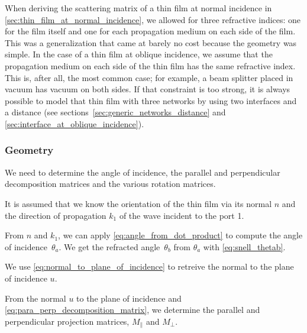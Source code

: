 When deriving the scattering matrix of a thin film at normal incidence in \cref{sec:thin_film_at_normal_incidence}, we allowed for three refractive indices: one for the film itself and one for each propagation medium on each side of the film.
This was a generalization that came at barely no cost because the geometry was simple.
In the case of a thin film at oblique incidence, we assume that the propagation medium on each side of the thin film has the same refractive index.
This is, after all, the most common case;
for example, a beam splitter placed in vacuum has vacuum on both sides.
If that constraint is too strong, it is always possible to model that thin film with three networks by using two interfaces and a distance (see sections~\ref{sec:generic_networks_distance} and \ref{sec:interface_at_oblique_incidence}).

\subsubsection{Geometry}
\label{sec:thin_film_geometry}
We need to determine the angle of incidence, the parallel and perpendicular decomposition matrices and the various rotation matrices.

It is assumed that we know the orientation of the thin film via its normal $n$ and the direction of propagation $k_1$ of the wave incident to the port 1.

From $n$ and $k_1$, we can apply \cref{eq:angle_from_dot_product} to compute the angle of incidence~$\theta_a$.
We get the refracted angle~$\theta_b$ from $\theta_a$ with \cref{eq:snell_thetab}.

We use \cref{eq:normal_to_plane_of_incidence} to retreive the normal to the plane of incidence $u$.

From the normal $u$ to the plane of incidence
and \cref{eq:para_perp_decomposition_matrix},
we determine the parallel and perpendicular projection matrices,
$M_\parallel$ and $M_\perp$.

